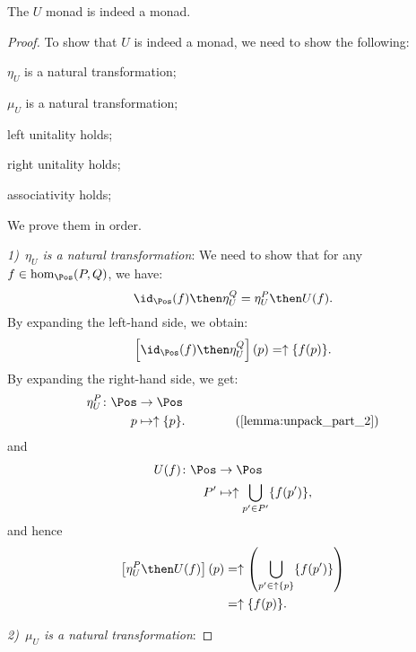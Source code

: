 \begin{lemma}
    The $U$ monad is indeed a monad.
\end{lemma}
\begin{proof}
    To show that $U$ is indeed a monad, we need to show the following:
    \begin{compactenum}
        \item $\eta_U$ is a natural transformation;
        \item $\mu_U$ is a natural transformation;
        \item left unitality holds;
        \item right unitality holds;
        \item associativity holds;
    \end{compactenum}
    We prove them in order.

    \emph{1)~$\eta_U$ is a natural transformation}: We need to show that for any~$f\in \hom_{\Pos}(P,Q)$, we have:
    \begin{equation}
        \id_{\Pos}(f)\then \eta_{U}^Q=\eta_{U}^P\then U(f).
    \end{equation}
    By expanding the left-hand side, we obtain:
    \begin{equation}
        \left[\id_{\Pos}(f)\then \eta_{U}^Q\right](p)=\uparrow \{f(p)\}.
    \end{equation}
    By expanding the right-hand side, we get:
    \begin{equation}
        \begin{aligned}
            \eta_{U}^P\colon \Pos &\to \Pos\\
            p&\mapsto \uparrow \{p\}. \qquad \qquad (\cref{lemma:unpack_part_2})
        \end{aligned}
    \end{equation}
    and
    \begin{equation}
        \begin{aligned}
            U(f)\colon \Pos &\to \Pos\\
            P'&\mapsto \uparrow \bigcup_{p'\in P'}\{f(p')\},
        \end{aligned}
    \end{equation}
    and hence
    \begin{equation}
        \begin{aligned}
            \left[\eta_{U}^P\then U(f)\right](p)&=\uparrow \left( \bigcup_{p'\in \uparrow \{p\}} \{f(p')\}\right)\\
            &=\uparrow \{f(p)\}.
        \end{aligned}
    \end{equation}

    \emph{2)~$\mu_U$ is a natural transformation}:
\end{proof}
